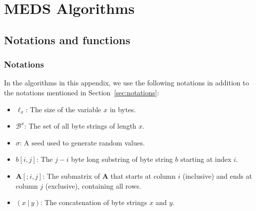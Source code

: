 \chapter{MEDS Algorithms}
\label{app:medsalgs}

\section{Notations and functions}

\subsection{Notations}
In the algorithms in this appendix, we use the following notations in addition to the notations mentioned in Section~\ref{sec:notations}:
\begin{itemize}
  \item $\ell_{x}$: The size of the variable $x$ in bytes.
  \item $\mathcal{B}^{x}$: The set of all byte strings of length $x$.
  \item $\sigma$: A seed used to generate random values.
  \item $b[i,j]$: The $j-i$ byte long substring of byte string $b$ starting at index $i$.
  \item $\textbf{A}[;i,j]$: The submatrix of $\textbf{A}$ that starts at column $i$ (inclusive) and ends at column $j$ (exclusive), containing all rows.
  \item $(x~|~y)$: The concatenation of byte strings $x$ and $y$.
\end{itemize}

